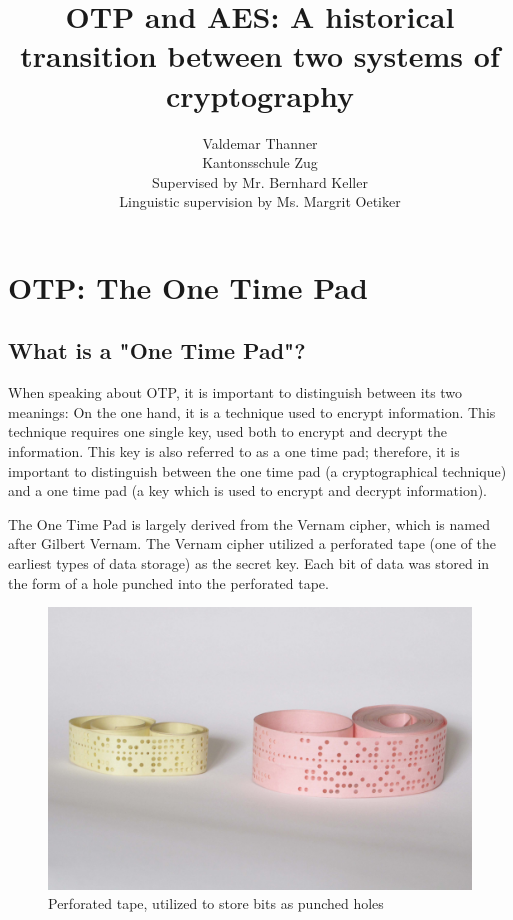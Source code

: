 \documentclass[12pt]{report}
\theoremstyle{definition}
\theoremstyle{remark}
\begin{document}
\title{OTP and AES: A historical transition between two systems of cryptography}
\author{Valdemar Thanner\\Kantonsschule Zug\\Supervised by Mr. Bernhard Keller\\Linguistic supervision by Ms. Margrit Oetiker}
\maketitle

\tableofcontents

\chapter{OTP: The One Time Pad}

\section{What is a "One Time Pad"?}
When speaking about OTP, it is important to distinguish between its two meanings: On the one hand, it is a technique used to encrypt information. This technique requires one single key, used both to encrypt and decrypt the information. This key is also referred to as a one time pad; therefore, it is important to distinguish between the one time pad (a cryptographical technique) and a one time pad (a key which is used to encrypt and decrypt information).

The One Time Pad is largely derived from the Vernam cipher, which is named after Gilbert Vernam. The Vernam cipher utilized a perforated tape (one of the earliest types of data storage) as the secret key\cite{VernamPatent}. Each bit of data was stored in the form of a hole punched into the perforated tape.

\begin{figure}[H]
\centering
\includegraphics[scale=0.5]{PerforatedTape}
\caption{Perforated tape, utilized to store bits as punched holes}
\end{figure}
\end{document}
